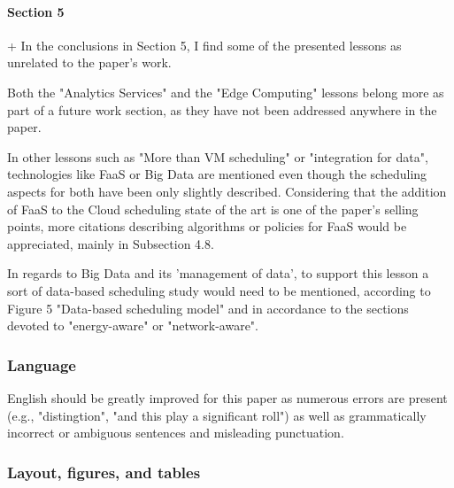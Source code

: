 
\paragraph{Section 5}

+ In the conclusions in Section 5, I find some of the presented lessons as unrelated to the paper's work.

Both the "Analytics Services" and the "Edge Computing" lessons belong more as part of a future work section, as they have not been addressed anywhere in the paper.



In other lessons such as "More than VM scheduling" or "integration for data", technologies like FaaS or Big Data are mentioned even though the scheduling aspects for both have been only slightly described. Considering that the addition of FaaS to the Cloud scheduling state of the art is one of the paper's selling points, more citations describing algorithms or policies for FaaS would be appreciated, mainly in Subsection 4.8.


In regards to Big Data and its 'management of data', to support this lesson a sort of data-based scheduling study would need to be mentioned, according to Figure 5 "Data-based scheduling model" and in accordance to the sections devoted to "energy-aware" or "network-aware".




\subsubsection{Language}

English should be greatly improved for this paper as numerous errors are present (e.g., "distingtion", "and this play a significant roll") as well as grammatically incorrect or ambiguous sentences and misleading punctuation.



\subsubsection{Layout, figures, and tables}

